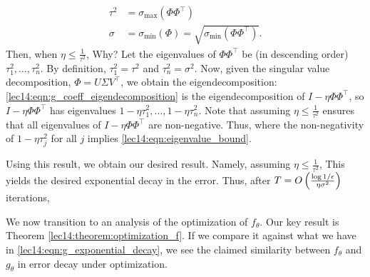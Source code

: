 \begin{align}
    \tau^2 &= \sigma_{\text{max}}(\Phi \Phi^\top) \\
    \sigma &= \sigma_\text{min}(\Phi) = \sqrt{\sigma_\text{min}(\Phi\Phi^\top)}. \label{lec14:eqn:sigma_def}
\end{align}
Then, when $\eta \leq \frac{1}{\tau^2}$,
Why? Let the eigenvalues of $\Phi \Phi^\top$ be (in descending order) $\tau_1^2, \dots , \tau_n^2$. By definition, $\tau_1^2 = \tau^2$ and $\tau_n^2 = \sigma^2$. Now, given the singular value decomposition, $\Phi = U\Sigma V^\top$, we obtain the eigendecomposition: 
\eqref{lec14:eqn:g_coeff_eigendecomposition} is the eigendecomposition of $I - \eta \Phi \Phi^\top$, so $I - \eta \Phi \Phi^\top$ has eigenvalues $1 - \eta \tau_1^2, \dots, 1 - \eta \tau_n^2$. Note that assuming $\eta \leq \frac{1}{\tau^2}$ ensures that all eigenvalues of $I - \eta \Phi \Phi^\top$ are non-negative. Thus,
where the non-negativity of $1 - \eta \tau_j^2$ for all $j$ implies \eqref{lec14:eqn:eigenvalue_bound}.

Using this result, we obtain our desired result. Namely, assuming $\eta \leq \frac{1}{\tau^2}$,
This yields the desired exponential decay in the error. Thus, after $T = O \left( \frac{\log 1/\epsilon}{\eta \sigma^2}\right)$ iterations, 

We now transition to an analysis of the optimization of $f_{\theta}$. Our key result is Theorem \ref{lec14:theorem:optimization_f}. If we compare it against what we have in \eqref{lec14:eqn:g_exponential_decay}, we see the claimed similarity between $f_\theta$ and $g_\theta$ in error decay under optimization. 

